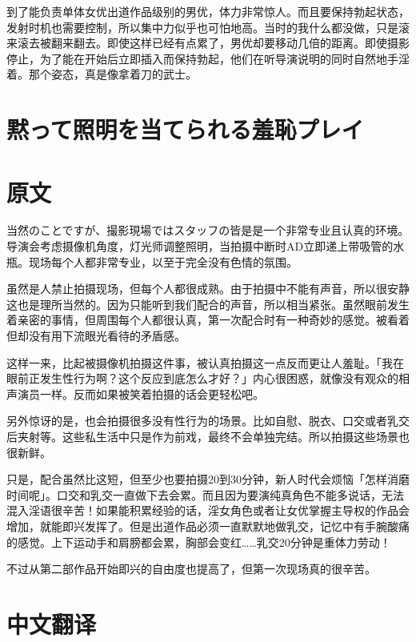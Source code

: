\documentclass[12pt,UTF8]{ctexbook}
\begin{document}
到了能负责单体女优出道作品级别的男优，体力非常惊人。而且要保持勃起状态，发射时机也需要控制，所以集中力似乎也可怕地高。当时的我什么都没做，只是滚来滚去被翻来翻去。即使这样已经有点累了，男优却要移动几倍的距离。即使摄影停止，为了能在开始后立即插入而保持勃起，他们在听导演说明的同时自然地手淫着。那个姿态，真是像拿着刀的武士。

\switchcolumn

\section{黙って照明を当てられる羞恥プレイ}

\switchcolumn

\section*{原文}

当然のことですが、撮影現場ではスタッフの皆是是一个非常专业且认真的环境。导演会考虑摄像机角度，灯光师调整照明，当拍摄中断时AD立即递上带吸管的水瓶。现场每个人都非常专业，以至于完全没有色情的氛围。

虽然是人禁止拍摄现场，但每个人都很成熟。由于拍摄中不能有声音，所以很安静这也是理所当然的。因为只能听到我们配合的声音，所以相当紧张。虽然眼前发生着亲密的事情，但周围每个人都很认真，第一次配合时有一种奇妙的感觉。被看着但却没有用下流眼光看待的矛盾感。

这样一来，比起被摄像机拍摄这件事，被认真拍摄这一点反而更让人羞耻。「我在眼前正发生性行为啊？这个反应到底怎么才好？」内心很困惑，就像没有观众的相声演员一样。反而如果被笑着拍摄的话会更轻松吧。

另外惊讶的是，也会拍摄很多没有性行为的场景。比如自慰、脱衣、口交或者乳交后夹射等。这些私生活中只是作为前戏，最终不会单独完结。所以拍摄这些场景也很新鲜。

只是，配合虽然比这短，但至少也要拍摄20到30分钟，新人时代会烦恼「怎样消磨时间呢」。口交和乳交一直做下去会累。而且因为要演纯真角色不能多说话，无法混入淫语很辛苦！如果能积累经验的话，淫女角色或者让女优掌握主导权的作品会增加，就能即兴发挥了。但是出道作品必须一直默默地做乳交，记忆中有手腕酸痛的感觉。上下运动手和肩膀都会累，胸部会变红……乳交20分钟是重体力劳动！

不过从第二部作品开始即兴的自由度也提高了，但第一次现场真的很辛苦。

\switchcolumn

\section*{中文翻译}
\end{document}
